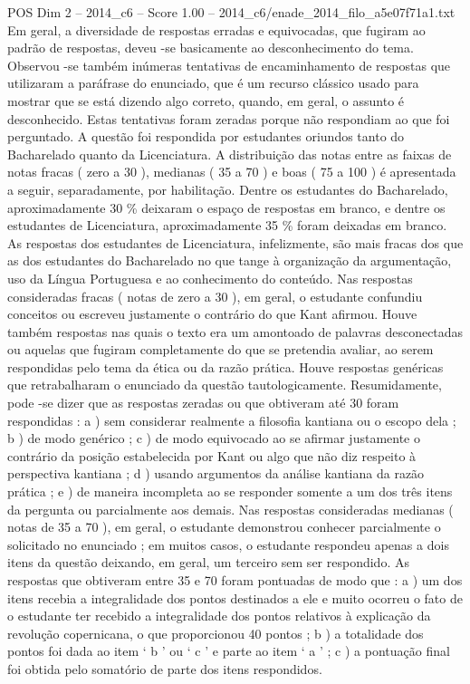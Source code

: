 \begin{textsample}{POS Dim 2 – 2014\_c6 – Score 1.00 – 2014\_c6/enade\_2014\_filo\_a5e07f71a1.txt}
Em geral, a diversidade de respostas erradas e equivocadas, que fugiram ao padrão de respostas, deveu -se basicamente ao desconhecimento do tema.
Observou -se também inúmeras tentativas de encaminhamento de respostas que utilizaram a paráfrase do enunciado, que é um recurso clássico usado para mostrar que se está dizendo algo correto, quando, em geral, o assunto é desconhecido.
Estas tentativas foram zeradas porque não respondiam ao que foi perguntado.
A questão foi respondida por estudantes oriundos tanto do Bacharelado quanto da Licenciatura.
A distribuição das notas entre as faixas de notas fracas ( zero a 30 ), medianas ( 35 a 70 ) e boas ( 75 a 100 ) é apresentada a seguir, separadamente, por habilitação.
Dentre os estudantes do Bacharelado, aproximadamente 30 \% deixaram o espaço de respostas em branco, e dentre os estudantes de Licenciatura, aproximadamente 35 \% foram deixadas em branco.
As respostas dos estudantes de Licenciatura, infelizmente, são mais fracas dos que as dos estudantes do Bacharelado no que tange à organização da argumentação, uso da Língua Portuguesa e ao conhecimento do conteúdo.
Nas respostas consideradas fracas ( notas de zero a 30 ), em geral, o estudante confundiu conceitos ou escreveu justamente o contrário do que Kant afirmou.
Houve também respostas nas quais o texto era um amontoado de palavras desconectadas ou aquelas que fugiram completamente do que se pretendia avaliar, ao serem respondidas pelo tema da ética ou da razão prática.
Houve respostas genéricas que retrabalharam o enunciado da questão tautologicamente.
Resumidamente, pode -se dizer que as respostas zeradas ou que obtiveram até 30 foram respondidas : a ) sem considerar realmente a filosofia kantiana ou o escopo dela ; b ) de modo genérico ; c ) de modo equivocado ao se afirmar justamente o contrário da posição estabelecida por Kant ou algo que não diz respeito à perspectiva kantiana ; d ) usando argumentos da análise kantiana da razão prática ; e ) de maneira incompleta ao se responder somente a um dos três itens da pergunta ou parcialmente aos demais.
Nas respostas consideradas medianas ( notas de 35 a 70 ), em geral, o estudante demonstrou conhecer parcialmente o solicitado no enunciado ; em muitos casos, o estudante respondeu apenas a dois itens da questão deixando, em geral, um terceiro sem ser respondido.
As respostas que obtiveram entre 35 e 70 foram pontuadas de modo que : a ) um dos itens recebia a integralidade dos pontos destinados a ele e muito ocorreu o fato de o estudante ter recebido a integralidade dos pontos relativos à explicação da revolução copernicana, o que proporcionou 40 pontos ; b ) a totalidade dos pontos foi dada ao item ‘ b ’ ou ‘ c ’ e parte ao item ‘ a ’ ; c ) a pontuação final foi obtida pelo somatório de parte dos itens respondidos.

\end{textsample}
